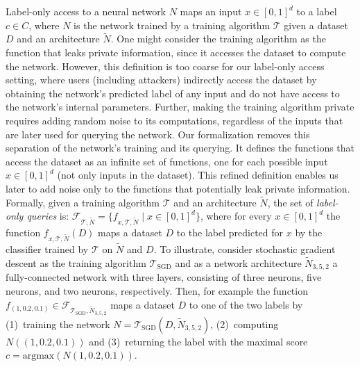 Label-only access to a neural network $N$ maps an input $x\in [0,1]^d$ to a label $c\in C$, where  
$N$ is the network trained by a training algorithm $\mathcal{T}$ given a dataset $D$ and an architecture %
$\widetilde{N}$.
One might consider the training algorithm as the function that leaks private information, since it accesses the dataset to compute the network. 
However, this definition is too coarse for our label-only access setting, where 
users (including attackers) indirectly access the dataset by obtaining the network's predicted label of any input and do not have access to the network's internal parameters.
 Further, making the training algorithm private requires adding random noise to its computations, regardless of the inputs that are later used for querying the network.  
%
Our formalization removes this separation of the network's training and its querying. It defines the functions that access the dataset as an infinite set of functions, one for each possible input $x\in [0,1]^d$ (not only inputs in the dataset). This refined definition enables us later to add noise only to the functions that potentially leak private information. 
Formally, given a training algorithm $\mathcal{T}$ and an architecture $\widetilde{N}$,
the set of \emph{label-only queries} is: $\mathcal{F}_{\mathcal{T},\widetilde{N}} = \{f_{x,\mathcal{T},\widetilde{N}} \mid x\in [0,1]^d\}$, where for every $x\in [0,1]^d$ the function $f_{x,\mathcal{T},\widetilde{N}}(D)$ maps a dataset $D$ to the label predicted for $x$ by the classifier trained by $\mathcal{T}$ on $\widetilde{N}$ and $D$. 
To illustrate, consider stochastic gradient descent as the training algorithm $\mathcal{T}_\text{SGD}$ and as a network architecture $\widetilde{N}_{3,5,2}$ a fully-connected network with three layers, consisting of three neurons, five neurons, and two neurons, respectively. 
Then, for example the function $f_{(1,0.2,0.1)}\in \mathcal{F}_{\mathcal{T}_\text{SGD},\widetilde{N}_{3,5,2}}$ maps a dataset 
$D$ to one of the two labels by (1)~training the network $N=\mathcal{T}_\text{SGD}(D,\widetilde{N}_{3,5,2})$, (2)~computing $N((1,0.2,0.1))$ and (3)~returning the label with the maximal score $c=\text{argmax}(N(1,0.2,0.1))$.

